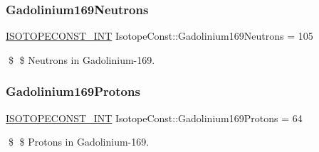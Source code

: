 \subsubsection{\texorpdfstring{Gadolinium169\+Neutrons}{Gadolinium169Neutrons}}
{\footnotesize\ttfamily \mbox{\hyperlink{group___isotope_const-_macros_ga5f18360b3e99483a35c32d789e62621c}{I\+S\+O\+T\+O\+P\+E\+C\+O\+N\+S\+T\+\_\+\+I\+NT}} Isotope\+Const\+::\+Gadolinium169\+Neutrons = 105}

\$ \$ Neutrons in Gadolinium-\/169. \mbox{\label{group___isotope_const-_gadolinium-_gd169_ga2f00e4ff001858b8e5179f348ae09af0}} 
\subsubsection{\texorpdfstring{Gadolinium169\+Protons}{Gadolinium169Protons}}
{\footnotesize\ttfamily \mbox{\hyperlink{group___isotope_const-_macros_ga5f18360b3e99483a35c32d789e62621c}{I\+S\+O\+T\+O\+P\+E\+C\+O\+N\+S\+T\+\_\+\+I\+NT}} Isotope\+Const\+::\+Gadolinium169\+Protons = 64}

\$ \$ Protons in Gadolinium-\/169. 